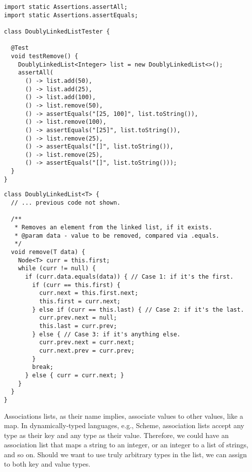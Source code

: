 \begin{lstlisting}[language=MyJava]
import static Assertions.assertAll;
import static Assertions.assertEquals;

class DoublyLinkedListTester {

  @Test
  void testRemove() {
    DoublyLinkedList<Integer> list = new DoublyLinkedList<>();
    assertAll(
      () -> list.add(50),
      () -> list.add(25),
      () -> list.add(100),
      () -> list.remove(50),
      () -> assertEquals("[25, 100]", list.toString()),
      () -> list.remove(100),
      () -> assertEquals("[25]", list.toString()),
      () -> list.remove(25),
      () -> assertEquals("[]", list.toString()),
      () -> list.remove(25),
      () -> assertEquals("[]", list.toString()));
  }
}
\end{lstlisting}

\begin{lstlisting}[language=MyJava]
class DoublyLinkedList<T> {
  // ... previous code not shown.

  /**
   * Removes an element from the linked list, if it exists.
   * @param data - value to be removed, compared via .equals.
   */
  void remove(T data) {
    Node<T> curr = this.first;
    while (curr != null) {
      if (curr.data.equals(data)) { // Case 1: if it's the first.
        if (curr == this.first) {
          curr.next = this.first.next;
          this.first = curr.next;
        } else if (curr == this.last) { // Case 2: if it's the last.
          curr.prev.next = null;
          this.last = curr.prev;
        } else { // Case 3: if it's anything else.
          curr.prev.next = curr.next;
          curr.next.prev = curr.prev;
        }
        break;
      } else { curr = curr.next; }
    }
  }
}
\end{lstlisting}


Associations lists, as their name implies, associate values to other values, like a map. In dynamically-typed languages, e.g., Scheme, association lists accept any type as their key and any type as their value. Therefore, we could have an association list that maps a string to an integer, or an integer to a list of strings, and so on. Should we want to use truly arbitrary types in the list, we can assign  to both key and value types.

